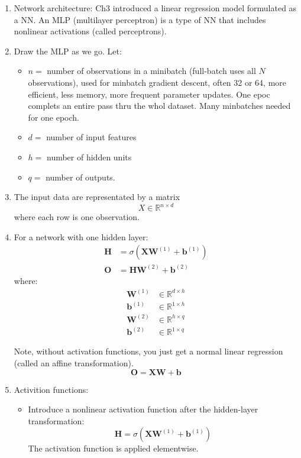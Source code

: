 \documentclass{article}
\begin{document}
\begin{enumerate}
\item Network architecture: Ch3 introduced a linear regression model formulated as a NN. An MLP (multilayer perceptron) is a type of NN that includes nonlinear activations (called perceptrons).

\item Draw the MLP as we go. Let:
\begin{itemize}
\item $n=$ number of observations in a minibatch (full-batch uses all $N$ observations), used for minbatch gradient descent, often 32 or 64, more efficient, less memory, more frequent parameter updates. One epoc complets an entire pass thru the whol dataset. Many minbatches needed for one epoch.
\item $d=$ number of input features
\item $h=$ number of hidden units
\item $q=$ number of outputs.
\end{itemize}

\item The input data are representated by a matrix
\[
X \in \mathbb{R}^{n \times d}
\]
where each row is one observation.

\item For a network with one hidden layer:
\[
\begin{aligned}
\mathbf{H} &= \sigma(\mathbf{X}\mathbf{W}^{(1)}
+\mathbf{b}^{(1)})\\
\mathbf{O} &= \mathbf{H}\mathbf{W}^{(2)}
+\mathbf{b}^{(2)}
\end{aligned}
\]
where:
\[
\begin{aligned}
\mathbf{W}^{(1)}&\in\mathbb{R}^{d\times h}\\
\mathbf{b}^{(1)}&\in\mathbb{R}^{1\times h}\\
\mathbf{W}^{(2)}&\in\mathbb{R}^{h\times q}\\
\mathbf{b}^{(2)}&\in\mathbb{R}^{1\times q}
\end{aligned}
\]

Note, without activation functions, you just get a normal linear regression (called an affine transformation).
\[
\mathbf{O}=\mathbf{X}\mathbf{W}+\mathbf{b}
\]

\item Activition functions:
\begin{itemize}
\item Introduce a nonlinear activation function after the hidden-layer transformation:
\[
\boxed{
\mathbf{H}=\sigma(\mathbf{X}\mathbf{W}^{(1)}
+\mathbf{b}^{(1)})
}
\]
The activation function is applied elementwise.


\end{itemize}
\end{enumerate}
\end{document}

